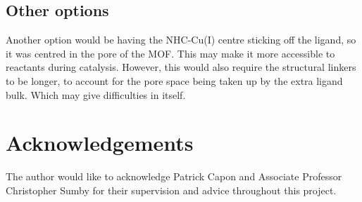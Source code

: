\documentclass[12pt,a4paper]{article}
\begin{document}
\subsection{Other options}\label{sec:other-fut}
Another option would be having the NHC-Cu(I) centre sticking off the ligand, so it was centred in the pore of the MOF. This may make it more accessible to reactants during catalysis. However, this would also require the structural linkers to be longer, to account for the pore space being taken up by the extra ligand bulk. Which may give difficulties in itself.

\section{Acknowledgements}\label{sec:thanks}
The author would like to acknowledge Patrick Capon and Associate Professor Christopher Sumby for their supervision and advice throughout this project.

{}\label{sec:bib}

\end{document}

